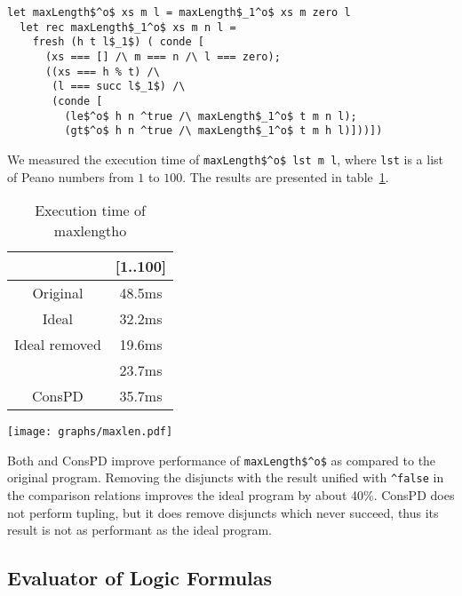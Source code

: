 \begin{figure*}[!h]
  \centering
  \begin{minipage}{0.7\textwidth}
\begin{lstlisting}[label={ideal:maxandlength}, caption={Ideal implementation of maxlengtho}, captionpos=b, frame=tb]
  let maxLength$^o$ xs m l = maxLength$_1^o$ xs m zero l
  let rec maxLength$_1^o$ xs m n l =
    fresh (h t l$_1$) ( conde [
      (xs === [] /\ m === n /\ l === zero);
      ((xs === h % t) /\
       (l === succ l$_1$) /\
       (conde [
         (le$^o$ h n ^true /\ maxLength$_1^o$ t m n l);
         (gt$^o$ h n ^true /\ maxLength$_1^o$ t m h l)]))])
  \end{lstlisting}
\end{minipage}
\end{figure*}

We measured the execution time of \lstinline{maxLength$^o$ lst m l}, where \lstinline{lst} is a list of Peano numbers from $1$ to $100$.
The results are presented in table~\ref{tbl:maxlen}.


\begin{table}
  \centering
  \begin{tabular}{c||c}
                   & [1..100] \\ \hline\hline
  Original         & 48.5ms  \\ \hline
  Ideal            & 32.2ms  \\ \hline
  Ideal removed    & 19.6ms  \\ \hline
  \ecce            & 23.7ms  \\ \hline
  ConsPD          & 35.7ms
  \end{tabular}

  \caption{Execution time of maxlengtho}
  \label{tbl:maxlen}
\end{table}

\texttt{[image: graphs/maxlen.pdf]}

Both \ecce and ConsPD improve performance of \lstinline{maxLength$^o$} as compared to the original program.
Removing the disjuncts with the result unified with \lstinline{^false} in the comparison relations improves the ideal program by about 40\%.
ConsPD does not perform tupling, but it does remove disjuncts which never succeed, thus its result is not as performant as the ideal program.


\subsection{Evaluator of Logic Formulas}

